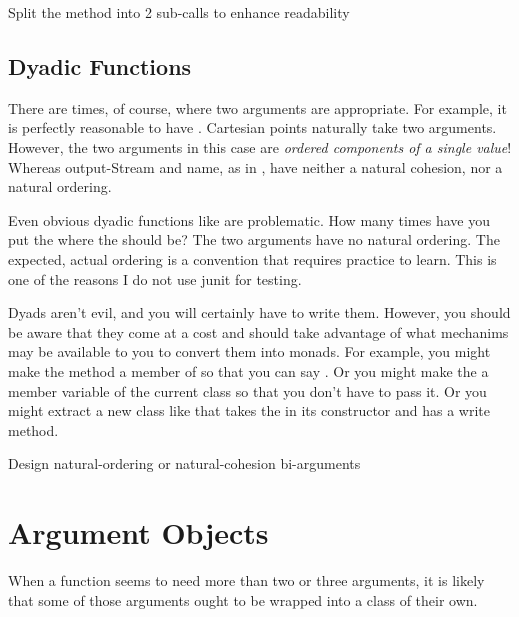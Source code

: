 \begin{marker}
Split the method into 2 sub-calls to enhance readability 
\end{marker}

\subsection{Dyadic Functions}

There are times, of course, where two arguments are appropriate. For example, it is perfectly reasonable to have . Cartesian points naturally take two arguments. However, the two arguments in this case are \textit{ordered components of a single value}! Whereas output-Stream and name, as in , have neither a natural cohesion, nor a natural ordering.

Even obvious dyadic functions like  are problematic.
How many times have you put the  where the  should be? The two arguments have no natural ordering. The expected, actual ordering is a convention that requires practice to learn. This is one of the reasons I do not use junit for testing.

Dyads aren’t evil, and you will certainly have to write them. However, you should be aware that they come at a cost and should take advantage of what mechanims may be available to you to convert them into monads. For example, you might make the  method a member of  so that you can say . Or you might make the  a member variable of the current class so that you don’t have to pass it. Or you might extract a new class like  that takes the  in its constructor and has a write method.

\begin{marker}
Design natural-ordering or natural-cohesion bi-arguments
\end{marker}

\section{Argument Objects}

When a function seems to need more than two or three arguments, it is likely that some of those arguments ought to be wrapped into a class of their own.

